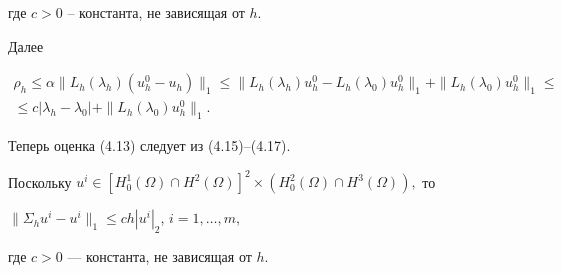 где $c>0$ -- константа, не зависящая от $h$.


Далее


\begin{multline}


\rho_h\le\alpha \|L_h(\lambda_h)(u^0_h-u_h)\|_1\le


\|L_h(\lambda_h)u^0_h-L_h(\lambda_0)u^0_h\|_1+


\|L_h(\lambda_0)u^0_h\|_1\le \\


%


\le c |\lambda_h-\lambda_0|+\|L_h(\lambda_0)u^0_h\|_1.


\end{multline}


Теперь оценка (4.13) следует из (4.15)--(4.17).





\begin{notes} Поскольку $u^i\in [H_0^1(\Omega)\cap H^2(\Omega)]^2\times


(H_0^2(\Omega)\cap H^3(\Omega)),$ то


$\|\Sigma_h u^i-u^i\|_1\le ch|u^i|_2$, $i=1,\dotsc,m,$


где $c>0$ --- константа, не зависящая от $h$.


\end{notes}





